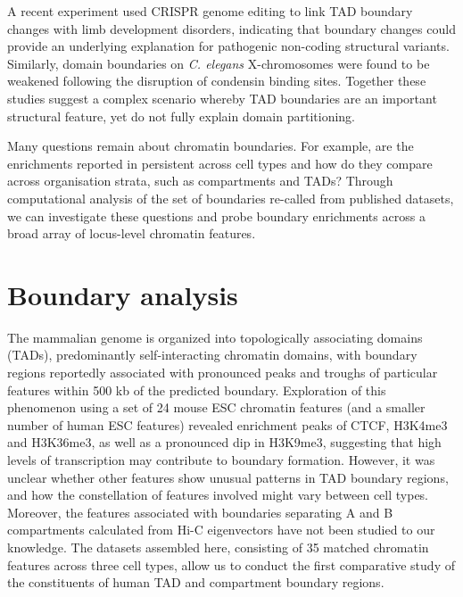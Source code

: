 \documentclass[a4paper,11pt,oneside]{book}
\begin{document}
A recent experiment used CRISPR genome editing to link TAD boundary changes with limb development disorders,\cite{Lupianez2015} indicating that boundary changes could provide an underlying explanation for pathogenic non-coding structural variants.\cite{Ren2015} Similarly, domain boundaries on \emph{C. elegans} X-chromosomes were found to be weakened following the disruption of condensin binding sites.\cite{Crane2015} Together these studies suggest a complex scenario whereby TAD boundaries are an important structural feature, yet do not fully explain domain partitioning.


Many questions remain about chromatin boundaries. For example, are the enrichments reported in \citet{Dixon2012} persistent across cell types and how do they compare across organisation strata, such as compartments and TADs? Through computational analysis of the set of boundaries re-called from published datasets, we can investigate these questions and probe boundary enrichments across a broad array of locus-level chromatin features.

\section{Boundary analysis}\label{sec:boundaryenrichments}

The mammalian genome is organized into topologically associating domains (TADs), predominantly self-interacting chromatin domains, with boundary regions reportedly associated with pronounced peaks and troughs of particular features within 500 kb of the predicted boundary.\cite{Dixon2012} Exploration of this phenomenon using a set of 24 mouse ESC chromatin features (and a smaller number of human ESC features) revealed enrichment peaks of CTCF, H3K4me3 and H3K36me3, as well as a pronounced dip in H3K9me3, suggesting that high levels of transcription may contribute to boundary formation.\cite{Dixon2012} However, it was unclear whether other features show unusual patterns in TAD boundary regions, and how the constellation of features involved might vary between cell types. Moreover, the features associated with boundaries separating A and B compartments calculated from Hi-C eigenvectors have not been studied to our knowledge. The datasets assembled here, consisting of 35 matched chromatin features across three cell types, allow us to conduct the first comparative study of the constituents of human TAD and compartment boundary regions.
\end{document}
